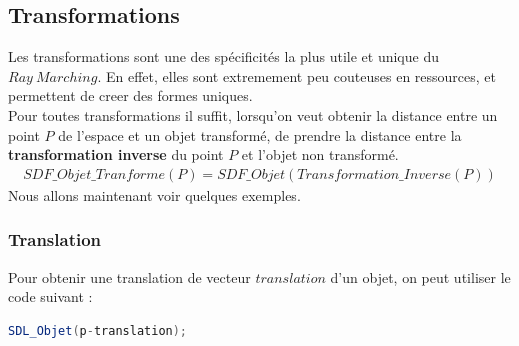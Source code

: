 \newpage
\subsection{Transformations}\label{subsec:Transformations}
Les transformations sont une des spécificités la plus utile et unique du $Ray\ Marching$. En effet, elles sont extremement peu couteuses en ressources, et permettent de creer des formes uniques.
\\Pour toutes transformations il suffit, lorsqu'on veut obtenir la distance entre un point $P$ de l'espace et un objet transformé, de prendre la distance entre la \textbf{transformation inverse} du point $P$ et l'objet non transformé.
\begin{align*}
    SDF\_Objet\_Tranforme(P)=SDF\_Objet(Transformation\_Inverse(P))
\end{align*}
Nous allons maintenant voir quelques exemples.

\subsubsection{Translation}
Pour obtenir une translation de vecteur $translation$ d'un objet, on peut utiliser le code suivant :
\begin{lstlisting}[language=GLSL]
SDL_Objet(p-translation);
\end{lstlisting}

